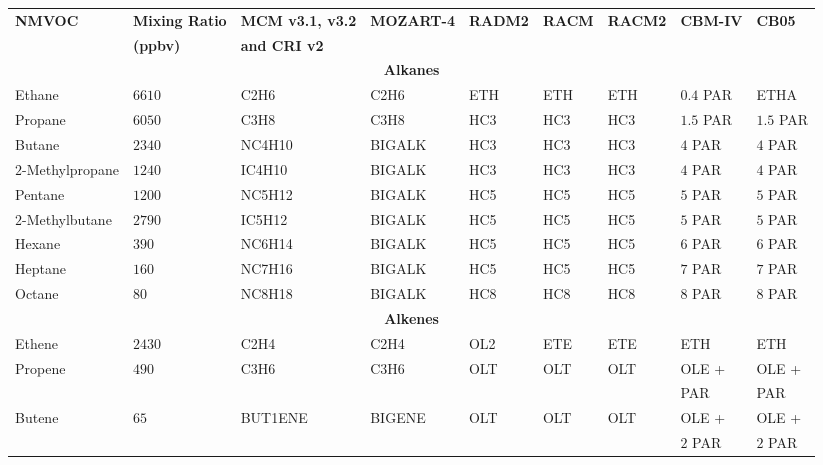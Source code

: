 \begin{sidewaystable}
    \centering
    \begin{tabular}{lllllllll}
        \hline \hline
        \multirow{2}{*}{\textbf{NMVOC}} & \textbf{Mixing Ratio} & \textbf{MCM v3.1, v3.2} & \multirow{2}{*}{\textbf{MOZART-4}} & \multirow{2}{*}{\textbf{RADM2}} & \multirow{2}{*}{\textbf{RACM}} & \multirow{2}{*}{\textbf{RACM2}} & \multirow{2}{*}{\textbf{CBM-IV}} & \multirow{2}{*}{\textbf{CB05}}\\ & \textbf{(ppbv)} & \textbf{and CRI v2} & & & & & & \\ 
        \hline \hline \multicolumn{9}{c}{\textbf{Alkanes}}  \\ \hline
        Ethane & $6610$ & C2H6 & C2H6 & ETH & ETH & ETH & $0.4$ PAR & ETHA \\
        Propane  & $6050$ & C3H8 & C3H8 & HC3 & HC3 & HC3 & $1.5$ PAR & $1.5$ PAR \\
        Butane & $2340$ & NC4H10 & BIGALK & HC3 & HC3 & HC3 & $4$ PAR & $4$ PAR \\
        $2$-Methylpropane & $1240$ & IC4H10 & BIGALK & HC3 & HC3 & HC3 & $4$ PAR & $4$ PAR \\
        Pentane & $1200$ & NC5H12 & BIGALK & HC5 & HC5 & HC5 & $5$ PAR & $5$ PAR \\
        $2$-Methylbutane & $2790$ & IC5H12 & BIGALK & HC5 & HC5 & HC5 & $5$ PAR & $5$ PAR \\
        Hexane & $390$ & NC6H14 & BIGALK & HC5 & HC5 & HC5 & $6$ PAR & $6$ PAR \\
        Heptane & $160$ & NC7H16 &  BIGALK & HC5 & HC5 & HC5 & $7$ PAR & $7$ PAR \\
        Octane & $80$ & NC8H18 & BIGALK & HC8 & HC8 & HC8 & $8$ PAR & $8$ PAR \\ \hline 
        \multicolumn{9}{c}{\textbf{Alkenes}} \\ \hline
        Ethene & $2430$ & C2H4 & C2H4 & OL2 & ETE & ETE & ETH & ETH \\
        \multirow{2}{*}{Propene} & \multirow{2}{*}{$490$} & \multirow{2}{*}{C3H6} & \multirow{2}{*}{C3H6} & \multirow{2}{*}{OLT} & \multirow{2}{*}{OLT} & \multirow{2}{*}{OLT} & OLE + & OLE + \\ & & & & & & & \hspace{3mm}PAR & \hspace{3mm}PAR \\
        \multirow{2}{*}{Butene} & \multirow{2}{*}{$65$} & \multirow{2}{*}{BUT1ENE} & \multirow{2}{*}{BIGENE} & \multirow{2}{*}{OLT} & \multirow{2}{*}{OLT} & \multirow{2}{*}{OLT} & OLE + & OLE + \\ & & & & & & & \hspace{3mm}$2$ PAR & \hspace{3mm}$2$ PAR \\

\end{tabular}
\end{sidewaystable}
